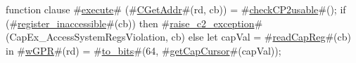 function clause #\hyperref[zexecute]{execute}# (#\hyperref[zCGetAddr]{CGetAddr}#(rd, cb)) =
{
  #\hyperref[zcheckCPtwousable]{checkCP2usable}#();
  if (#\hyperref[zregisterzyinaccessible]{register\_inaccessible}#(cb)) then
    #\hyperref[zraisezyctwozyexception]{raise\_c2\_exception}#(CapEx_AccessSystemRegsViolation, cb)
  else
    let capVal = #\hyperref[zreadCapReg]{readCapReg}#(cb) in
    #\hyperref[zwGPR]{wGPR}#(rd) = #\hyperref[ztozybits]{to\_bits}#(64, #\hyperref[zgetCapCursor]{getCapCursor}#(capVal));
}
